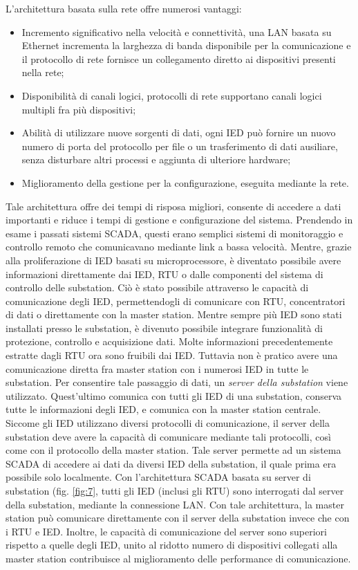 L'architettura basata sulla rete offre numerosi vantaggi:
\begin{itemize}
	\item Incremento significativo nella velocità e connettività, una LAN basata su Ethernet incrementa la larghezza di banda disponibile per la comunicazione e il protocollo di rete fornisce un collegamento diretto ai dispositivi presenti nella rete;
	\item Disponibilità di canali logici, protocolli di rete supportano canali logici multipli fra più dispositivi;
	\item Abilità di utilizzare nuove sorgenti di dati, ogni IED può fornire un nuovo numero di porta del protocollo per file o un trasferimento di dati ausiliare, senza disturbare altri processi e aggiunta di ulteriore hardware;
	\item Miglioramento della gestione per la configurazione, eseguita mediante la rete.
\end{itemize}
Tale architettura offre dei tempi di risposa migliori, consente di accedere a dati importanti e riduce i tempi di gestione e configurazione del sistema. Prendendo in esame i passati sistemi SCADA, questi erano semplici sistemi di monitoraggio e controllo remoto che comunicavano mediante link a bassa velocità. Mentre, grazie alla proliferazione di IED basati su microprocessore, è diventato possibile avere informazioni direttamente dai IED, RTU o dalle componenti del sistema di controllo delle substation. Ciò è stato possibile attraverso le capacità di comunicazione degli IED, permettendogli di comunicare con RTU, concentratori di dati o direttamente con la master station. Mentre sempre più IED sono stati installati presso le substation, è divenuto possibile integrare funzionalità di protezione, controllo e acquisizione dati. Molte informazioni precedentemente estratte dagli RTU ora sono fruibili dai IED. Tuttavia non è pratico avere una comunicazione diretta fra master station con i numerosi IED in tutte le substation. Per consentire tale passaggio di dati, un \emph{server della substation} viene utilizzato. Quest'ultimo comunica con tutti gli IED di una substation, conserva tutte le informazioni degli IED, e comunica con la master station centrale. Siccome gli IED utilizzano diversi protocolli di comunicazione, il server della substation deve avere la capacità di comunicare mediante tali protocolli, così come con il protocollo della master station. Tale server permette ad un sistema SCADA di accedere ai dati da diversi IED della substation, il quale prima era possibile solo localmente.
\newline
Con l'architettura SCADA basata su server di substation (fig. \ref{fig:7}, tutti gli IED (inclusi gli RTU) sono interrogati dal server della substation, mediante la connessione LAN. Con tale architettura, la master station può comunicare direttamente con il server della substation invece che con i RTU e IED. Inoltre, le capacità di comunicazione del server sono superiori rispetto a quelle degli IED, unito al ridotto numero di dispositivi collegati alla master station contribuisce al miglioramento delle performance di comunicazione.

